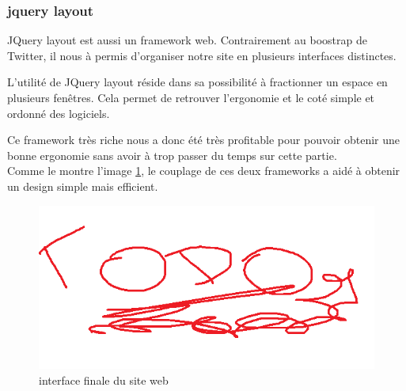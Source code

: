 \subsubsection{jquery layout}

JQuery layout est aussi un framework web. Contrairement au boostrap de Twitter, il nous à permis d'organiser notre site en plusieurs interfaces distinctes. 

L'utilité de JQuery layout réside dans sa possibilité à fractionner un espace en plusieurs fenêtres. Cela permet de retrouver l'ergonomie et le coté simple et ordonné des logiciels. 

Ce framework très riche nous a donc été très profitable pour pouvoir obtenir une bonne ergonomie sans avoir
à trop passer du temps sur cette partie.
\\


Comme le montre l'image \ref{design-final}, le couplage de ces deux frameworks a aidé à obtenir un design simple mais efficient. 

\begin{figure}[!h]
	\center
	\includegraphics[width=13cm]{img/design-final.png}
	\caption{interface finale du site web}
	\label{design-final}
\end{figure}


